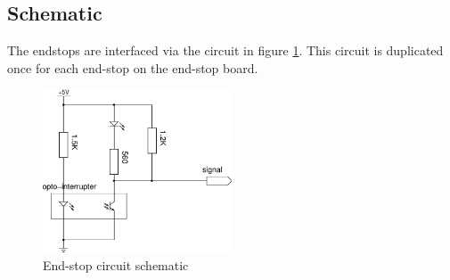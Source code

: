 			
		\subsection{Schematic}
			
			\label{sec:endstopDiagram}
			
			The endstops are interfaced via the circuit in figure
			\ref{fig:endstopschem}. This circuit is duplicated once for each end-stop
			on the end-stop board.
			
			\begin{figure}[p]
				\center
				\includegraphics[width=0.5\textwidth]{circuits/endstop.pdf}
				\caption{End-stop circuit schematic}
				\label{fig:endstopschem}
			\end{figure}
